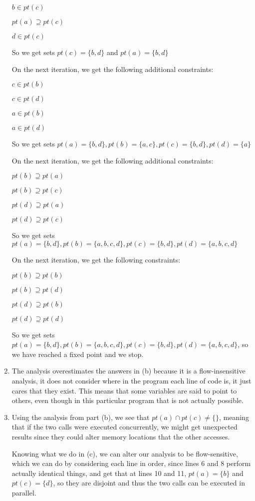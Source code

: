 \begin{enumerate}[label=(\alph*)]
      $b \in pt(c)$
      
      $pt(a) \supseteq pt(c)$

      $d \in pt(c)$

      So we get sets $pt(c) = \{b,d\}$ and $pt(a) = \{b,d\}$

      On the next iteration, we get the following additional constraints:

      $c \in pt(b)$

      $c \in pt(d)$

      $a \in pt(b)$

      $a \in pt(d)$
      
      So we get sets $pt(a) = \{b,d\}, pt(b) = \{a,c\}, pt(c) = \{b,d\}, pt(d) = \{a\}$

      On the next iteration, we get the following additional constraints:

      $pt(b) \supseteq pt(a)$

      $pt(b) \supseteq pt(c)$

      $pt(d) \supseteq pt(a)$

      $pt(d) \supseteq pt(c)$

      So we get sets $pt(a) = \{b,d\}, pt(b) = \{a,b,c,d\}, pt(c) = \{b,d\}, pt(d) = \{a,b,c,d\}$

      On the next iteration, we get the following constraints:

      $pt(b) \supseteq pt(b)$

      $pt(b) \supseteq pt(d)$

      $pt(d) \supseteq pt(b)$

      $pt(d) \supseteq pt(d)$

      So we get sets $pt(a)= \{b,d\}, pt(b) = \{a,b,c,d\}, pt(c) = \{b,d\}, pt(d) = \{a,b,c,d\}$, so we have reached a fixed point and we stop.

      \item
        The analysis overestimates the answers in (b) because it is a flow-insensitive analysis, it does not consider where in the program each line of code is, it just cares that they exist. This means that some variables are said to point to others, even though in this particular program that is not actually possible.

        \item
          Using the analysis from part (b), we see that $pt(a) \cap pt(c) \neq \{\}$, meaning that if the two calls were executed concurrently, we might get unexpected results since they could alter memory locations that the other accesses. 

          Knowing what we do in (c), we can alter our analysis to be flow-sensitive, which we can do by considering each line in order, since lines 6 and 8 perform actually identical things, and get that at lines 10 and 11, $pt(a) = \{b\}$ and $pt(c) = \{d\}$, so they are disjoint and thus the two calls can be executed in parallel.







        
    \end{enumerate}

